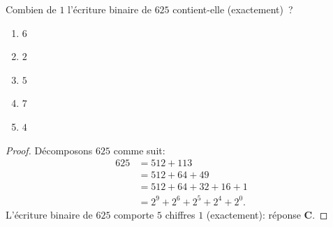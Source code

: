 %
Combien de $1$ l'écriture binaire de $625$ contient-elle (exactement)~?
\begin{enumerate}
  \item $6$
  \item $2$
  \item $5$
  \item $7$
  \item $4$
\end{enumerate}
%
%
\begin{proof}
Décomposons $625$ comme suit:
%
\begin{align}
  625 &= 512 + 113 \\
  &= 512 + 64 + 49 \\
  &= 512 + 64 + 32 + 16 + 1\\
  &= 2^9 + 2^6 + 2^5 + 2^4 + 2^0.
\end{align}
L'écriture binaire de $625$ comporte $5$ chiffres $1$ (exactement): réponse \textbf{C}.
\end{proof}